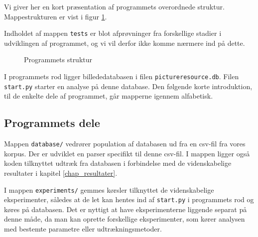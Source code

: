{
{\sffamily Vi giver her en kort præsentation af programmets overordnede
struktur. Mappestrukturen er vist i figur \ref{program_struktur}.

Indholdet af mappen \texttt{tests} er blot afprøvninger fra forskellige
stadier i udviklingen af programmet, og vi vil derfor ikke komme nærmere
ind på dette.

\begin{figure}[!h]
    \caption[]{Programmets struktur}
    \label{program_struktur}
\end{figure}

I programmets rod ligger billededatabasen i filen
\texttt{pictureresource.db}. Filen \texttt{start.py} starter en analyse
på denne database. Den følgende korte introduktion, til de enkelte dele
af programmet, går mapperne igennem alfabetisk.

}

\subsection{Programmets dele}

\vspace{1.4em}
\vspace{1.4em}
Mappen \texttt{database/} vedrører population af databasen ud fra en
csv-fil fra vores korpus. Der er udviklet en parser specifikt til denne
csv-fil. I mappen ligger også koden tilknyttet udtræk fra databasen
i forbindelse med de videnskabelige resultater i kapitel
\ref{chap_resultater}.

\vspace{1.4em}
\vspace{1.4em}

I mappen \texttt{experiments/} gemmes kørsler tilknyttet de
videnskabelige eksperimenter, således at de let kan hentes ind af
\texttt{start.py} i programmets rod og køres på databasen. Det er
nyttigt at have eksperimenterne liggende separat på denne måde, da man
kan oprette forskellige eksperimenter, som kører analysen med bestemte
parametre eller udtrækningsmetoder.

\vspace{1.4em}
\vspace{1.4em}

}
